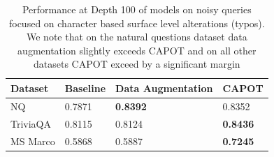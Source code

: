\begin{table}[htb!]
    \centering
        \begin{tabular}{|l|l|l|l|}
    \hline
        Dataset & Baseline & Data Augmentation & CAPOT \\ \hline
        NQ & 0.7871 & \textbf{0.8392} & 0.8352 \\ \hline
        TriviaQA & 0.8115 & 0.8124 & \textbf{0.8436} \\ \hline
        MS Marco & 0.5868 & 0.5887 & \textbf{0.7245} \\ \hline
    \end{tabular}
    \caption{Performance at Depth 100 of models on noisy queries focused on character based surface level alterations (typos). We note that on the natural questions dataset data augmentation slightly exceeds CAPOT and on all other datasets CAPOT exceed by a significant margin}
    \label{tab:top100-typo}
\end{table}

